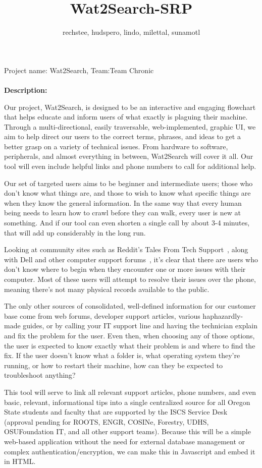 \documentclass[12pt, letterpaper]{article}
\title{Wat2Search-SRP}
\author{rechstee, hudspero, lindo, milettal, sunamotl 
}
\begin{document}
\maketitle Project name: Wat2Search, Team:Team Chronic
	\\\\\textbf{Description:}
	
	Our project, Wat2Search, is designed to be an interactive and engaging flowchart that helps educate and inform users of what exactly is plaguing their machine. Through a multi-directional, easily traversable, web-implemented, graphic UI, we aim to help direct our users to the correct terms, phrases, and ideas to get a better grasp on a variety of technical issues. From hardware to software, peripherals, and almost everything in between, Wat2Search will cover it all. Our tool will even include helpful links and phone numbers to call for additional help.
	
	Our set of targeted users aims to be beginner and intermediate users; those who don’t know what things are, and those to wish to know what specific things are when they know the general information. In the same way that every human being needs to learn how to crawl before they can walk, every user is new at something. And if our tool can even shorten a single call by about 3-4 minutes, that will add up considerably in the long run.
	
	Looking at community sites such as Reddit’s Tales From Tech Support~\cite{redditTFTS}, along with Dell and other computer support forums~\cite{dellforums}, it’s clear that there are users who don’t know where to begin when they encounter one or more issues with their computer. Most of these users will attempt to resolve their issues over the phone, meaning there’s not many physical records available to the public. 
	
	The only other sources of consolidated, well-defined information for our customer base come from web forums, developer support articles, various haphazardly-made guides, or by calling your IT support line and having the technician explain and fix the problem for the user. Even then, when choosing any of those options, the user is expected to know exactly what their problem is and where to find the fix. If the user doesn’t know what a folder is, what operating system they’re running, or how to restart their machine, how can they be expected to troubleshoot anything?
	
	This tool will serve to link all relevant support articles, phone numbers, and even basic, relevant, informational tips into a single centralized source for all Oregon State students and faculty that are supported by the ISCS Service Desk (approval pending for ROOTS, ENGR, COSINe, Forestry, UDHS, OSUFoundation IT, and all other support teams). Because this will be a simple web-based application without the need for external database management or complex authentication/encryption, we can make this in Javascript and embed it in HTML.
	
\end{document}
